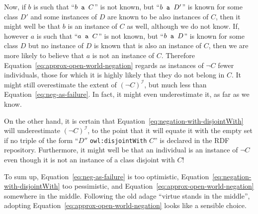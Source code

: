 \documentclass[a4paper]{article}
\newcounter{ex}
\begin{document}
\begin{itemize}
Now, if $b$ is such that ``$b \mbox{\tt\ a } C$'' is not known, but ``$b \mbox{\tt\ a } D'$''
is known for some class $D'$ and some instances of $D$ are known to be also
instances of $C$, then it might well be that $b$ is an instance of $C$ as well,
although we do not know. If, however $a$ is such that ``$a \mbox{\tt\ a } C$''
is not known, but ``$b \mbox{\tt\ a } D$'' is known for some class $D$ but
no instance of $D$ is known that is also an instance of $C$, then we are more
likely to believe that $a$ is not an instance of $C$.
Therefore Equation~\ref{eq:approx-open-world-negation} regards as instances of $\neg C$
fewer individuals, those for which it is highly likely that they do not belong
in $C$. It might still overestimate the extent of $(\neg C)^\mathcal{I}$, but much less
than Equation~\ref{eq:neg-as-failure}. In fact, it might even underestimate it,
as far as we know.

On the other hand, it is certain that Equation~\ref{eq:negation-with-disjointWith}
will underestimate $(\neg C)^\mathcal{I}$, to the point that it will equate it
with the empty set if no triple of the form ``$D''$ \texttt{owl:disjointWith} $C$''
is declared in the RDF repository. Furthermore, it might well be that an individual
is an instance of $\neg C$ even though it is not an instance of a class disjoint with $C$!

To sum up, Equation~\ref{eq:neg-as-failure} is too optimistic,
Equation~\ref{eq:negation-with-disjointWith} too pessimistic, and
Equation~\ref{eq:approx-open-world-negation} somewhere in the middle.
Following the old adage ``virtue stands in the middle'', adopting
Equation~\ref{eq:approx-open-world-negation} looks like a sensible choice.


\end{itemize}
\end{document}

